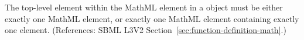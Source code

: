The top-level element within the MathML  element in a
\FunctionDefinition object must be either exactly one MathML 
element, or exactly one MathML  element containing exactly
one  element.  (References: SBML L3V2
Section~\ref{sec:function-definition-math}.)
